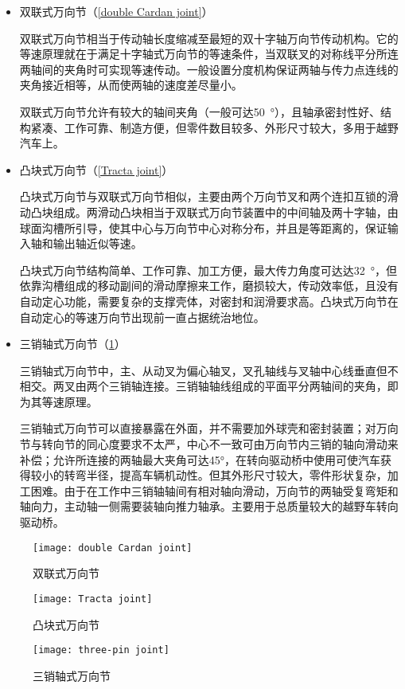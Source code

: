 \documentclass[UTF8]{ctexart}
\numberwithin{figure}{section}
\numberwithin{table}{section}
\begin{document}
\begin{itemize}
	\item 双联式万向节（\cref{double Cardan joint}）

	      双联式万向节相当于传动轴长度缩减至最短的双十字轴万向节传动机构。它的等速原理就在于满足十字轴式万向节的等速条件，当双联叉的对称线平分所连两轴间的夹角时可实现等速传动。一般设置分度机构保证两轴与传力点连线的夹角接近相等，从而使两轴的速度差尽量小。

	      双联式万向节允许有较大的轴间夹角（一般可达\SI{50}{\degree}），且轴承密封性好、结构紧凑、工作可靠、制造方便，但零件数目较多、外形尺寸较大，多用于越野汽车上。

	\item 凸块式万向节（\cref{Tracta joint}）

	      凸块式万向节与双联式万向节相似，主要由两个万向节叉和两个连扣互锁的滑动凸块组成。两滑动凸块相当于双联式万向节装置中的中间轴及两十字轴，由球面沟槽所引导，使其中心与万向节中心对称分布，并且是等距离的，保证输入轴和输出轴近似等速。

	      凸块式万向节结构简单、工作可靠、加工方便，最大传力角度可达达\SI{32}{\degree}，但依靠沟槽组成的移动副间的滑动摩擦来工作，磨损较大，传动效率低，且没有自动定心功能，需要复杂的支撑壳体，对密封和润滑要求高。凸块式万向节在自动定心的等速万向节出现前一直占据统治地位。

	\item 三销轴式万向节（\cref{three-pin joint}）

	      三销轴式万向节中，主、从动叉为偏心轴叉，叉孔轴线与叉轴中心线垂直但不相交。两叉由两个三销轴连接。三销轴轴线组成的平面平分两轴间的夹角，即为其等速原理。

	      三销轴式万向节可以直接暴露在外面，并不需要加外球壳和密封装置；对万向节与转向节的同心度要求不太严，中心不一致可由万向节内三销的轴向滑动来补偿；允许所连接的两轴最大夹角可达45°，在转向驱动桥中使用可使汽车获得较小的转弯半径，提高车辆机动性。但其外形尺寸较大，零件形状复杂，加工困难。由于在工作中三销轴轴间有相对轴向滑动，万向节的两轴受复弯矩和轴向力，主动轴一侧需要装轴向推力轴承。主要用于总质量较大的越野车转向驱动桥。
\end{itemize}

\begin{figure}[htbp]
	\centering
	\begin{minipage}[b]{0.4\textwidth}
		\centering
		\texttt{[image: double Cardan joint]}
		\caption{双联式万向节}
		\label{double Cardan joint}
	\end{minipage}
	\begin{minipage}[b]{0.5\textwidth}
		\centering
		\texttt{[image: Tracta joint]}
		\caption{凸块式万向节}
		\label{Tracta joint}
	\end{minipage}
	\begin{minipage}[b]{0.4\textwidth}
		\centering
		\texttt{[image: three-pin joint]}
		\caption{三销轴式万向节}
		\label{three-pin joint}
	\end{minipage}
\end{figure}
\end{document}
